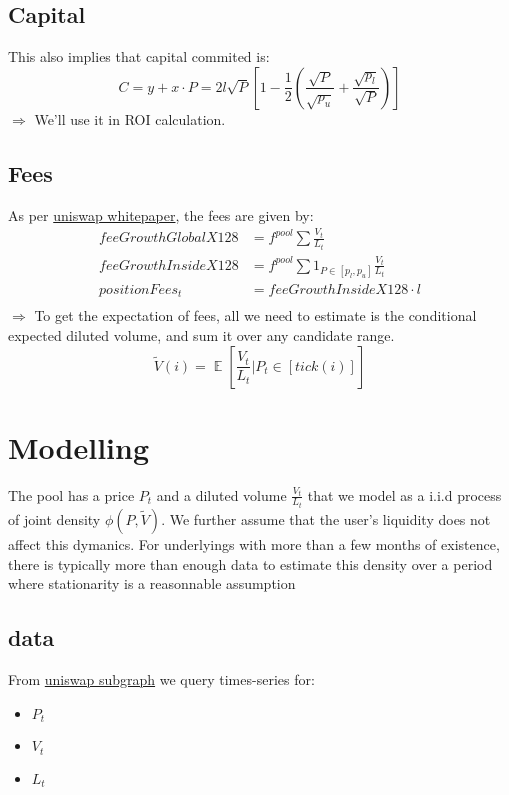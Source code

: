 \documentclass[12pt]{article}
\DeclareMathOperator*{\E}{\mathbb{E}}
\begin{document}
\subsection{Capital}
This also implies that capital commited is:
\begin{equation}
C = y + x \cdot P = 2 l \sqrt{P} [1 - \frac{1}{2}(\frac{\sqrt{P}}{\sqrt{p_u}}+\frac{\sqrt{p_l}}{\sqrt{P}})]
\end{equation}
$\Rightarrow$ We'll use it in ROI calculation.

\subsection{Fees}
As per \href{https://whitepaper.io/document/708/uniswap-whitepaper}{uniswap whitepaper}, the fees are given by:
\begin{eqnarray*}
      feeGrowthGlobalX128 &= f^{pool} \sum{\frac{V_t}{L_t}} \\
      feeGrowthInsideX128 &= f^{pool} \sum{1_{P \in [p_l,p_u]} \frac{V_t}{L_t}} \\
      positionFees_t &= feeGrowthInsideX128 \cdot l \\
\end{eqnarray*}
$\Rightarrow$ To get the expectation of fees, all we need to estimate is the conditional expected diluted volume, and sum it over any candidate range.
\begin{equation}
\tilde{V}(i)=\E[\frac{V_t}{L_t} | P_t \in [tick(i)]]
\end{equation}


\section{Modelling}
The pool has a price $P_t$ and a diluted volume $\frac{V_t}{L_t}$ that we model as a i.i.d process of joint density $\phi(P, \tilde{V})$.
\newline \indent We further assume that the user's liquidity does not affect this dymanics.
For underlyings with more than a few months of existence, there is typically more than enough data to estimate this density over a period where stationarity is a reasonnable assumption\\
\subsection{data}
From \href{https://thegraph.com/hosted-service/subgraph/uniswap/uniswap-v3}{uniswap subgraph} we query times-series for:
\begin{itemize}
      \item $P_t$
      \item $V_t$
      \item $L_t$
\end{itemize}
\end{document}
